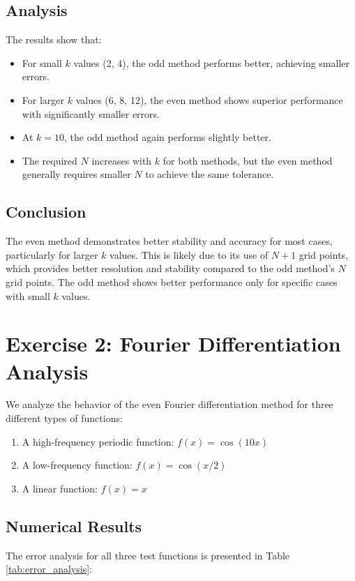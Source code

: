 \documentclass{article}
\begin{document}
\subsection{Analysis}
The results show that:
\begin{itemize}
    \item For small $k$ values (2, 4), the odd method performs better, achieving smaller errors.
    \item For larger $k$ values (6, 8, 12), the even method shows superior performance with significantly smaller errors.
    \item At $k=10$, the odd method again performs slightly better.
    \item The required $N$ increases with $k$ for both methods, but the even method generally requires smaller $N$ to achieve the same tolerance.
\end{itemize}

\subsection{Conclusion}
The even method demonstrates better stability and accuracy for most cases, particularly for larger $k$ values. This is likely due to its use of $N+1$ grid points, which provides better resolution and stability compared to the odd method's $N$ grid points. The odd method shows better performance only for specific cases with small $k$ values.

\section{Exercise 2: Fourier Differentiation Analysis}

We analyze the behavior of the even Fourier differentiation method for three different types of functions:
\begin{enumerate}
    \item A high-frequency periodic function: $f(x) = \cos(10x)$
    \item A low-frequency function: $f(x) = \cos(x/2)$
    \item A linear function: $f(x) = x$
\end{enumerate}

\subsection{Numerical Results}

The error analysis for all three test functions is presented in Table \ref{tab:error_analysis}:
\end{document}
